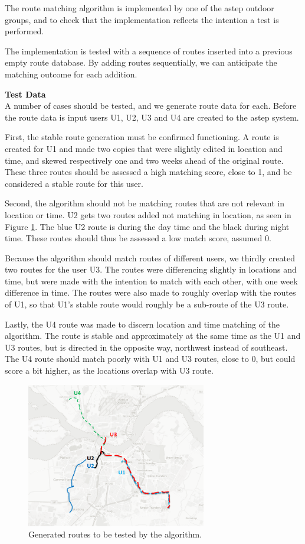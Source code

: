 The route matching algorithm is implemented by one of the \gls{astep} outdoor groups, and to check that the implementation reflects the intention a test is performed.

The implementation is tested with a sequence of routes inserted into a previous empty route database.
By adding routes sequentially, we can anticipate the matching outcome for each addition.


\textbf{Test Data}\\
A number of cases should be tested, and we generate route data for each. 
Before the route data is input users U1, U2, U3 and U4 are created to the \gls{astep} system.

First, the stable route generation must be confirmed functioning.
A route is created for U1 and made two copies that were slightly edited in location and time, and skewed respectively one and two weeks ahead of the original route.
These three routes should be assessed a high matching score, close to 1, and be considered a stable route for this user.

Second, the algorithm should not be matching routes that are not relevant in location or time.
U2 gets two routes added not matching in location, as seen in Figure \ref{fig:algroutes}.
The blue U2 route is during the day time and the black during night time.
These routes should thus be assessed a low match score, assumed 0.

Because the algorithm should match routes of different users, we thirdly created two routes for the user U3.
The routes were differencing slightly in locations and time, but were made with the intention to match with each other, with one week difference in time.
The routes were also made to roughly overlap with the routes of U1, so that U1's stable route would roughly be a sub-route of the U3 route.

Lastly, the U4 route was made to discern location and time matching of the algorithm.
The route is stable and approximately at the same time as the U1 and U3 routes, but is directed in the opposite way, northwest instead of southeast.
The U4 route should match poorly with U1 and U3 routes, close to 0, but could score a bit higher, as the locations overlap with U3 route.

\begin{figure}[h]
	\centering
	\includegraphics[width=0.7\textwidth]{figures/algorithmroutes.png}
	\caption{Generated routes to be tested by the algorithm.}
	\label{fig:algroutes}
\end{figure}


